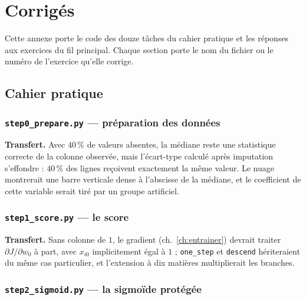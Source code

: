 \chapter{Corrigés}
\label{ann:corriges}


Cette annexe porte le code des douze tâches du cahier pratique et les réponses
aux exercices du fil principal. Chaque section porte le nom du fichier ou le
numéro de l'exercice qu'elle corrige.

\section{Cahier pratique}

\subsection*{\texttt{step0\_prepare.py} --- préparation des données}


\textbf{Transfert.} Avec $40\,\%$ de valeurs absentes, la médiane reste une
statistique correcte de la colonne observée, mais l'écart-type calculé après
imputation s'effondre : $40\,\%$ des lignes reçoivent exactement la même valeur.
Le nuage montrerait une barre verticale dense à l'abscisse de la médiane, et le
coefficient de cette variable serait tiré par un groupe artificiel.

\subsection*{\texttt{step1\_score.py} --- le score}


\textbf{Transfert.} Sans colonne de $1$, le gradient (ch.~\ref{ch:entrainer})
devrait traiter $\partial J/\partial w_0$ à part, avec $x_{i0}$ implicitement
égal à $1$ ; \texttt{one\_step} et \texttt{descend} hériteraient du même cas
particulier, et l'extension à dix matières multiplierait les branches.

\subsection*{\texttt{step2\_sigmoid.py} --- la sigmoïde protégée}

